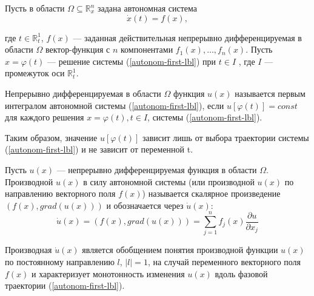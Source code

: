 \setcounter{equation}{0}

\par Пусть в области $\Omega \subseteq \mathbb{R}_x^n$ задана автономная система
\begin{equation}\label{autonom-first-lbl}
    \dot{x}(t) = f(x), 
\end{equation}

\par где $t \in \mathbb{R}_t^1$, $f(x)$ — заданная действительная непрерывно дифференцируемая в области $\Omega$ вектор-функция с $n$ компонентами $f_1(x), \ldots, f_n(x)$.
Пусть $x = \varphi(t)$ — решение системы (\ref{autonom-first-lbl}) при $t \in I$ , где $I$ — промежуток
оси $\mathbb{R}_t^1$.

\par \Def Непрерывно дифференцируемая в области $\Omega$ функция
$u(x)$ называется первым интегралом автономной системы (\ref{autonom-first-lbl}), если
$u[\varphi(t)] = const$ для каждого решения $x=\varphi(t), t \in I$, системы (\ref{autonom-first-lbl}).

\par Таким образом, значение $u[\varphi(t)]$ зависит лишь от выбора траектории
системы (\ref{autonom-first-lbl}) и не зависит от переменной t.

\par \Def Пусть $u(x)$ — непрерывно дифференцируемая функция в
области $\Omega$. Производной $u(x)$ в силу автономной системы (или производной $u(x)$ по направлению векторного поля $f(x)$) называется скалярное произведение $(f(x), grad(u(x)))$ и обозначается через $\dot{u}(x)$:
$$\dot{u}(x)=(f(x), grad(u(x)))=\sum_{j=1}^n f_j(x) \frac{\partial u}{\partial x_j}$$

\par \Note Производная $\dot{u}(x)$ является обобщением понятия производной функции $u(x)$ по постоянному направлению $l$, $|l| = 1$, на случай
переменного векторного поля $f(x)$ и характеризует монотонность изменения $u(x)$ вдоль фазовой траектории (\ref{autonom-first-lbl}).

